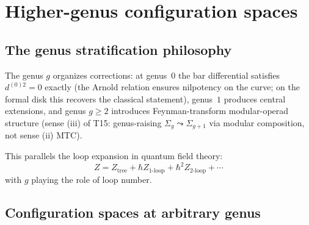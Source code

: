\section{Higher-genus configuration spaces}
\label{sec:higher-genus-config-complete}

\subsection{The genus stratification philosophy}

\begin{remark}
\label{rem:genus-quantum}
The genus $g$ organizes corrections: at genus~$0$ the bar differential satisfies~$d^{(0)2} = 0$ exactly (the Arnold relation ensures nilpotency on the curve; on the formal disk this recovers the classical statement), genus~$1$ produces central extensions, and genus $g \geq 2$ introduces Feynman-transform modular-operad structure (sense (iii) of T15: genus-raising $\Sigma_g \leadsto \Sigma_{g+1}$ via modular composition, not sense (ii) MTC).

This parallels the loop expansion in quantum field theory:
\begin{equation}
Z = Z_{\text{tree}} + \hbar Z_{\text{1-loop}} + \hbar^2 Z_{\text{2-loop}} + \cdots
\end{equation}
with $g$ playing the role of loop number.
\end{remark}

\subsection{Configuration spaces at arbitrary genus}

